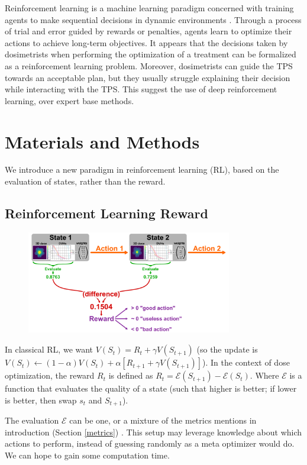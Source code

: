 Reinforcement learning is a machine learning paradigm concerned with training agents to make sequential decisions in dynamic environments \cite{brooks_what_2021}.
Through a process of trial and error guided by rewards or penalties, agents learn to optimize their actions to achieve long-term objectives.
It appears that the decisions taken by dosimetrists when performing the optimization of a treatment can be formalized as a reinforcement learning problem.
Moreover, dosimetrists can guide the TPS towards an acceptable plan, but they usually struggle explaining their decision while interacting with the TPS.
This suggest the use of deep reinforcement learning, over expert base methods.

\section{Materials and Methods}
We introduce a new paradigm in reinforcement learning (RL), based on the evaluation of states, rather than the reward.

\subsection{Reinforcement Learning Reward}

\begin{figure}
	\centering
	\includegraphics[width=0.8\textwidth]{reward.pdf}
	\caption{}
	\label{fig:reward_fig}
\end{figure}

In classical RL, we want $V(S_t) = R_t + \gamma V(S_{t+1})$
(so the update is $V(S_t) \leftarrow (1-\alpha) V(S_t) + \alpha \left[ R_{t+1} + \gamma V(S_{t+1}) \right]$).
In the context of dose optimization, the reward $R_t$ is defined as $R_t = \mathcal{E}(S_{t+1}) - \mathcal{E}(S_t)$.
Where $\mathcal{E}$ is a function that evaluates the quality of a state (such that higher is better; if lower is better, then swap $s_t$ and $S_{t+1}$).

The evaluation $\mathcal{E}$ can be one, or a mixture of the metrics mentions in introduction (Section \ref{metrics}) \cite{shen_hierarchical_2021} \cite{shen_intelligent_2019} \cite{moreau_reinforcement_2021}.
This setup may leverage knowledge about which actions to perform, instead of guessing randomly as a meta optimizer would do.
We can hope to gain some computation time.

